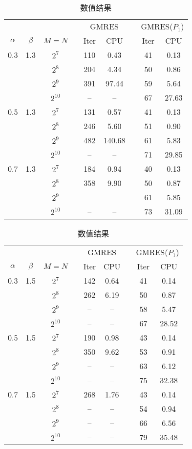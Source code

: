 \documentclass{ecnumaster}
\begin{document}
\begin{table}[H]
\centering
\caption{数值结果} \label{tab3341}\smallskip
\begin{tabular}{ccccccccc} \toprule
& &  && \multicolumn{2}{c}{GMRES} && \multicolumn{2}{c}{GMRES($P_1$)} \\
$\alpha$ & $\beta$ & $M = N$ && Iter & CPU && Iter & CPU\\ \midrule
0.3 & 1.3
 & $2^7$    && 110 & 0.43   && 41 & 0.13   \\
&& $2^8$    && 204 & 4.34   && 50 & 0.86   \\
&& $2^9$    && 391 & 97.44  && 59 & 5.64   \\
&& $2^{10}$ && --  & --     && 67 & 27.63  \\  \midrule
0.5 & 1.3
 & $2^7$    && 131 & 0.57   && 41 & 0.13   \\
&& $2^8$    && 246 & 5.60   && 51 & 0.90   \\
&& $2^9$    && 482 & 140.68 && 61 & 5.83   \\
&& $2^{10}$ && --  & --     && 71 & 29.85  \\ \midrule
0.7 & 1.3
 & $2^7$    && 184 & 0.94   && 40 & 0.13   \\
&& $2^8$    && 358 & 9.90   && 50 & 0.87   \\
&& $2^9$    && --  & --     && 61 & 5.85   \\
&& $2^{10}$ && --  & --     && 73 &31.09   \\ \bottomrule
\end{tabular}
\end{table}

\begin{table}[H] %
\centering %
\caption{数值结果} \label{tab33411}\smallskip %
\begin{tabular}{ccccccccc} \toprule
& &  && \multicolumn{2}{c}{GMRES} && \multicolumn{2}{c}{GMRES($P_1$)} \\
$\alpha$ & $\beta$ & $M = N$ && Iter & CPU && Iter & CPU\\ \midrule
0.3 & 1.5
 & $2^7$    && 142 &0.64 && 41 &0.14  \\
&& $2^8$    && 262 &6.19 && 50 &0.87  \\
&& $2^9$    && --  &--   && 58 &5.47  \\
&& $2^{10}$ && --  &--   && 67 &28.52 \\\midrule
0.5 &1.5
 & $2^7$    && 190 &0.98 && 43 &0.14  \\
&& $2^8$    && 350 &9.62 && 53 &0.91  \\
&& $2^9$    && --  &--   && 63 &6.12  \\
&& $2^{10}$ && --  &--   && 75 &32.38 \\ \midrule
0.7 &1.5
 & $2^7$    && 268 &1.76 && 43 &0.14  \\
&& $2^8$    && --  &--   && 54 &0.94  \\
&& $2^9$    && --  &--   && 66 &6.56  \\
&& $2^{10}$ && -- &--    && 79 &35.48 \\ \bottomrule
\end{tabular}
\end{table}
\end{document}
